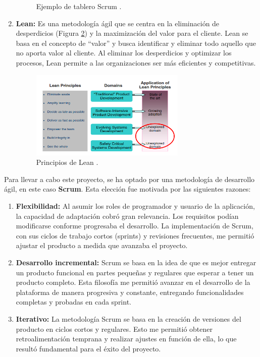 \begin{enumerate}
\begin{figure}[H]
        \caption{Ejemplo de tablero Scrum \cite{karabiyik2020understanding}.}
        \label{fig:scrum}
    \end{figure}
    \item \textbf{Lean:} Es una metodología ágil que se centra en la eliminación de desperdicios (Figura \ref{fig:lean}) y la maximización del valor para el cliente. Lean se basa en el concepto de ``valor'' y busca identificar y eliminar todo aquello que no aporta valor al cliente. Al eliminar los desperdicios y optimizar los procesos, Lean permite a las organizaciones ser más eficientes y competitivas.
    \begin{figure}[H]
        \centering
        \includegraphics[width=0.7\textwidth]{imagenes/lean.png}
        \caption{Principios de Lean \cite{cawley2010lean}.}
        \label{fig:lean}
    \end{figure}
\end{enumerate}

Para llevar a cabo este proyecto, se ha optado por una metodología de desarrollo ágil, en este caso \textbf{Scrum}. Esta elección fue motivada por las siguientes razones:

\begin{enumerate}
    \item \textbf{Flexibilidad:} Al asumir los roles de programador y usuario de la aplicación, la capacidad de adaptación cobró gran relevancia. Los requisitos podían modificarse conforme progresaba el desarrollo. La implementación de Scrum, con sus ciclos de trabajo cortos (sprints) y revisiones frecuentes, me permitió ajustar el producto a medida que avanzaba el proyecto.
    \item \textbf{Desarrollo incremental:} Scrum se basa en la idea de que es mejor entregar un producto funcional en partes pequeñas y regulares que esperar a tener un producto completo. Esta filosofía me permitió avanzar en el desarrollo de la plataforma de manera progresiva y constante, entregando funcionalidades completas y probadas en cada sprint.
    \item \textbf{Iterativo:} La metodología Scrum se basa en la creación de versiones del producto en ciclos cortos y regulares. Esto me permitió obtener retroalimentación temprana y realizar ajustes en función de ella, lo que resultó fundamental para el éxito del proyecto.
\end{enumerate}

